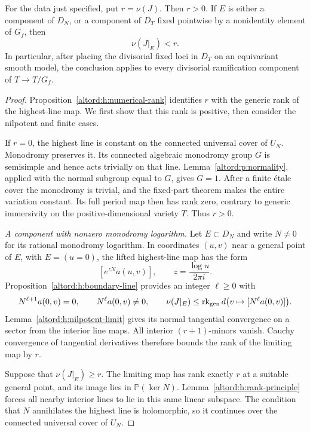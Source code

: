 \begin{theorem}\label{thm:rankloss}
For the data just specified, put $r=\nu(J)$.
Then $r>0$. If $E$ is either a component of $D_N$, or a component
of $D_T$ fixed pointwise by a nonidentity element of
$G_f$, then
\[
                           \nu(J|_E)<r.
\]
In particular, after placing the divisorial fixed loci in $D_T$
on an equivariant smooth model, the conclusion applies
to every divisorial ramification component of $T\to T/G_f$.
\end{theorem}

\begin{proof}
Proposition~\ref{altord:h:numerical-rank} identifies $r$ with the
generic rank of the highest-line map. We first show that this
rank is positive, then consider the nilpotent and finite cases.

If $r=0$, the highest line is constant on the connected universal
cover of $U_N$. Monodromy preserves it. Its connected algebraic
monodromy group $G$ is semisimple and hence acts trivially on that
line. Lemma~\ref{altord:p:normality}, applied with the normal
subgroup equal to $G$, gives $G=1$. After a finite \'etale cover the
monodromy is trivial, and the fixed-part theorem makes the entire
variation constant. Its full period map then has rank zero,
contrary to generic immersivity on the positive-dimensional variety
$T$. Thus $r>0$.

\smallskip\noindent
\emph{A component with nonzero monodromy logarithm.}
Let $E\subset D_N$ and write $N\ne0$ for its rational monodromy
logarithm. In coordinates $(u,v)$ near a general point of $E$,
with $E=(u=0)$, the lifted highest-line map has the form
\[
                [e^{zN}a(u,v)],\qquad z=\frac{\log u}{2\pi i}.
\]
Proposition~\ref{altord:h:boundary-line} provides an integer
$\ell\geq0$ with
\[
 N^{\ell+1}a(0,v)=0,\qquad N^\ell a(0,v)\ne0,
 \qquad
 \nu(J|_E)\leq\operatorname{rk}_{\rm gen}d\bigl(v\mapsto[N^\ell a(0,v)]\bigr).
\]
Lemma~\ref{altord:h:nilpotent-limit} gives its normal
tangential convergence on a sector from the interior line maps.
All interior $(r+1)$-minors vanish. Cauchy convergence of tangential
derivatives therefore bounds the rank of the limiting map by $r$.

Suppose that $\nu(J|_E)\geq r$. The limiting map has rank exactly
$r$ at a suitable general point, and its image lies in
$\mathbb P(\ker N)$. Lemma~\ref{altord:h:rank-principle} forces all
nearby interior lines to lie in this same linear subspace. The
condition that $N$ annihilates the highest line is holomorphic, so
it continues over the connected universal cover of $U_N$.


\end{proof}
